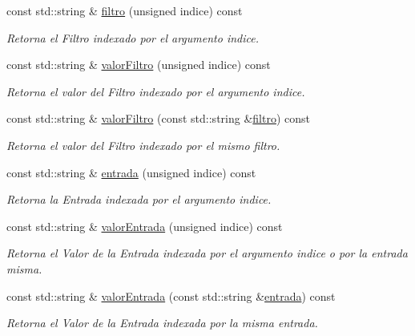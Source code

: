 \begin{DoxyCompactItemize}
const std\-::string \& \hyperlink{classConsulta_a51966644f6a3fb18e719ba8b10c9f862}{filtro} (unsigned indice) const 
\begin{DoxyCompactList}\small\item\em \-Retorna el \-Filtro indexado por el argumento indice. \end{DoxyCompactList}\item 
const std\-::string \& \hyperlink{classConsulta_a130e8ff49d0f34d4d02124c4b22ff33d}{valor\-Filtro} (unsigned indice) const 
\begin{DoxyCompactList}\small\item\em \-Retorna el valor del \-Filtro indexado por el argumento indice. \end{DoxyCompactList}\item 
const std\-::string \& \hyperlink{classConsulta_a99d8a8e585efeec3757cd46632b01290}{valor\-Filtro} (const std\-::string \&\hyperlink{classConsulta_a51966644f6a3fb18e719ba8b10c9f862}{filtro}) const 
\begin{DoxyCompactList}\small\item\em \-Retorna el valor del \-Filtro indexado por el mismo filtro. \end{DoxyCompactList}\item 
const std\-::string \& \hyperlink{classConsulta_a0f8951484349b8b31653615b1ff74bc3}{entrada} (unsigned indice) const 
\begin{DoxyCompactList}\small\item\em \-Retorna la \-Entrada indexada por el argumento indice. \end{DoxyCompactList}\item 
const std\-::string \& \hyperlink{classConsulta_a0e8eb452c594a166eadc35d3b49a8286}{valor\-Entrada} (unsigned indice) const 
\begin{DoxyCompactList}\small\item\em \-Retorna el \-Valor de la \-Entrada indexada por el argumento indice o por la entrada misma. \end{DoxyCompactList}\item 
const std\-::string \& \hyperlink{classConsulta_a8722053d1fe2d87550c3e1463cee471d}{valor\-Entrada} (const std\-::string \&\hyperlink{classConsulta_a0f8951484349b8b31653615b1ff74bc3}{entrada}) const 
\begin{DoxyCompactList}\small\item\em \-Retorna el \-Valor de la \-Entrada indexada por la misma entrada. \end{DoxyCompactList}\item 

\end{DoxyCompactItemize}
